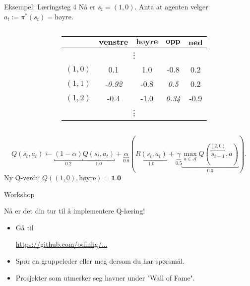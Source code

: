 \documentclass[UKenglish]{beamer}
\begin{document}
\begin{frame}{Eksempel: Læringsteg 4}
	Nå er $s_t=(1,0)$. Anta at agenten velger $a_t:=\pi^*(s_t)=\text{høyre}$.
	\vspace{-1em}
	\begin{columns}
		\begin{column}{0.4\textwidth}
			\begin{center}
				
			\end{center}
		\end{column}
		\begin{column}{0.6\textwidth}%
			\begin{table}[!hbt]
				\centering
				\def\arraystretch{1.0}
				\setlength{}
				\begin{tabular}{|c|c|c|c|c|}\hline
					\diagbox{$\textbf{s}$}{$\textbf{a}$} & $\textbf{venstre}$ & $\textbf{høyre}$ & $\textbf{opp}$ & $\textbf{ned}$\\ \hline
					\multicolumn{5}{|c|}{\vdots} \\ \hline
					\rowcolor{orange!35}$(1,0)$ & 0.1 & \cellcolor{orange!70}1.0 & -0.8 & 0.2 \\ \hline
					$(1,1)$ & \textit{-0.92} & -0.8 & \textit{0.5} & 0.2 \\ \hline
					$(1,2)$ & -0.4 & -1.0 & \textit{0.34} & -0.9 \\ \hline
					\multicolumn{5}{|c|}{\vdots}\\ \hline
				\end{tabular}
			\end{table}
		\end{column}
	\end{columns}		
	$$
	Q(s_t, a_t)\leftarrow\underbracket{(1-\alpha)}_{0.2}\underbracket{Q(s_t, a_t)}_{1.0}+\underbracket{\alpha}_{0.8}\left(\underbracket{R(s_t, a_t)}_{1.0}+\underbracket{\gamma}_{0.5}\underbracket{\max_{a\in\mathcal{A}} Q(\overbracket{s_{t+1}}^{(2,0)}, a)}_{0.0}\right).
	$$
	Ny Q-verdi: $Q((1,0), \text{høyre})=\textbf{1.0}$
\end{frame}

\begin{frame}{Workshop}

\vspace{1em}

Nå er det din tur til å implementere Q-læring!

\vspace{1em}

\begin{itemize}
	\setlength\itemsep{2em}
	\item Gå til 
	
	\vspace{0.5em}
	
	{\Large\url{https://github.com/odinhg/...}}
	
	\item Spør en gruppeleder eller meg dersom du har spørsmål.
	\item Prosjekter som utmerker seg havner under "Wall of Fame".
\end{itemize}


\end{frame}
\end{document}
